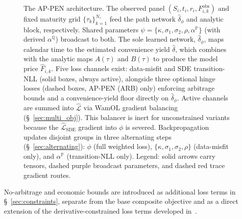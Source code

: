 \documentclass[11pt, a4paper]{article}
\begin{document}
\begin{figure}[!t]
{%
}
\caption{The AP-PEN architecture. The observed panel $(S_i, t_i, r_i, F^{\mathrm{obs}}_{i,k})$ and fixed maturity grid $\{\tau_k\}_{k=1}^{N_\tau}$ feed the path network $\hat{\delta}_\phi$ and analytic block, respectively. Shared parameters $\psi = \{\kappa, \sigma_1, \sigma_2, \rho, \alpha^{\mathbb{P}}\}$ (with derived $\alpha^{\mathbb{Q}}$) broadcast to both. The sole learned network, $\hat{\delta}_\phi$, maps calendar time to the estimated convenience yield $\hat{\delta}$, which combines with the analytic maps $A(\tau)$ and $B(\tau)$ to produce the model price $\hat{F}_{i,k}$. Five loss channels exist: data-misfit and SDE transition-NLL (solid boxes, always active), alongside three optional hinge losses (dashed boxes, AP-PEN (ARB) only) enforcing arbitrage bounds and a convenience-yield floor directly on $\hat{\delta}_\phi$. Active channels are summed into $\hat{\mathcal{L}}$ via WamOL gradient balancing (\S~\ref{sec:multi_obj}). This balancer is inert for unconstrained variants because the $\hat{\mathcal{L}}_{\mathrm{SDE}}$ gradient into $\phi$ is severed. Backpropagation updates disjoint groups in three alternating steps (\S~\ref{sec:alternating}): $\phi$ (full weighted loss), $\{\kappa, \sigma_1, \sigma_2, \rho\}$ (data-misfit only), and $\alpha^{\mathbb{P}}$ (transition-NLL only). Legend: solid arrows carry tensors, dashed purple broadcast parameters, and dashed red trace gradient routes.}
\label{fig:appinn}
\end{figure}

No-arbitrage and economic bounds are introduced as additional loss terms in \S~\ref{sec:constraints}, separate from the base composite objective and as a direct extension of the derivative-constrained loss terms developed in~\cite{Hoshisashi2024Physics-InformedPDEs}.
\end{document}
